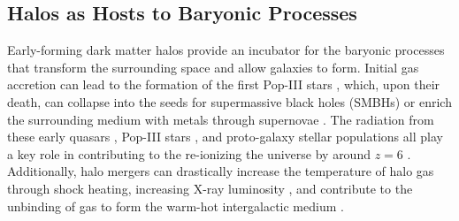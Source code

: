 \subsection{Halos as Hosts to Baryonic Processes}
\label{subsec:early_universe--baryonic_processes}


Early-forming dark matter halos provide an incubator for the baryonic processes that transform the surrounding space and allow galaxies to form.  Initial gas accretion can lead to the formation of the first Pop-III stars \citep{1986MNRAS.221...53C, 1997ApJ...474....1T, 2000ApJ...540...39A, 2002Sci...295...93A}, which, upon their death, can collapse into the seeds for supermassive black holes (SMBHs) \citep{2001ApJ...551L..27M, 2003MNRAS.340..647I, 2009ApJ...701L.133A, 2012ApJ...754...34J} or enrich the surrounding medium with metals through supernovae \citep{2002ApJ...567..532H, 2003ApJ...591..288H}.  The radiation from these early quasars \citep{1987ApJ...321L.107S, 1999ApJ...514..648M, 2001AJ....122.2833F}, Pop-III stars \citep{1997ApJ...486..581G, 2003ApJ...584..621V, 2006ApJ...639..621A}, and proto-galaxy stellar populations \citep{2012ApJ...752L...5B, 2012MNRAS.423..862K} all play a key role in contributing to the re-ionizing the universe by around $z = 6$ \citep{2001PhR...349..125B}.  Additionally, halo mergers can drastically increase the temperature of halo gas through shock heating, increasing X-ray luminosity \citep{2009MNRAS.397..190S}, and contribute to the unbinding of gas to form the warm-hot intergalactic medium \citep{2008SSRv..134..141B, 2010MNRAS.405L..31S, 2012MNRAS.425.2974T}.




